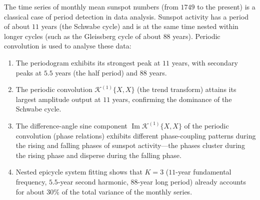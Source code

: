 \begin{example}\label{ex:sunspot_analysis}
The time series of monthly mean sunspot numbers (from $1749$ to the present) is a classical case of period detection in data analysis. Sunspot activity has a period of about $11$ years (the Schwabe cycle) and is at the same time nested within longer cycles (such as the Gleissberg cycle of about $88$ years). Periodic convolution is used to analyse these data:
\begin{enumerate}[label=(\roman*)]
    \item The periodogram exhibits its strongest peak at $11$ years, with secondary peaks at $5.5$ years (the half period) and $88$ years.
    \item The periodic convolution $\mathcal{K}^{(1)}\{X, X\}$ (the trend transform) attains its largest amplitude output at $11$ years, confirming the dominance of the Schwabe cycle.
    \item The difference-angle sine component $\operatorname{Im}\mathcal{K}^{(1)}\{X, X\}$ of the periodic convolution (phase relations) exhibits different phase-coupling patterns during the rising and falling phases of sunspot activity---the phases cluster during the rising phase and disperse during the falling phase.
    \item Nested epicycle system fitting shows that $K=3$ ($11$-year fundamental frequency, $5.5$-year second harmonic, $88$-year long period) already accounts for about $30\%$ of the total variance of the monthly series.
\end{enumerate}
\end{example}

